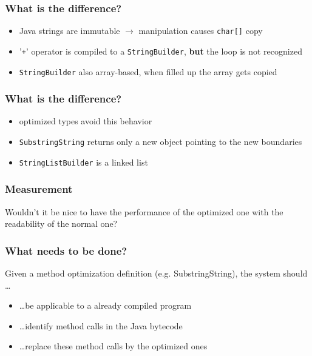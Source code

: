 \documentclass{beamer}
\begin{document}
\begin{frame}
  \frametitle{What is the difference?}
	\begin{itemize}
	  \item Java strings are immutable $\rightarrow$ manipulation causes \texttt{char[]} copy
	  \item '\texttt{+}' operator is compiled to a \texttt{StringBuilder}, {\bf but} the loop is not recognized
	  \item \texttt{StringBuilder} also array-based, when filled up the array gets copied 
	\end{itemize}
\end{frame}


\begin{frame}
  \frametitle{What is the difference?}
	\begin{itemize}
	  \item optimized types avoid this behavior 
	  \item \texttt{SubstringString} returns only a new object pointing to the new boundaries
	  \item \texttt{StringListBuilder} is a linked list
	\end{itemize} 
\end{frame}

\begin{frame}
  \frametitle{Measurement}

  \begin{bchart}[step=1000,max=3500]
      \smallskip
      \smallskip
  \end{bchart}
\end{frame}

\begin{frame}
  \begin{center}
  \huge Wouldn't it be nice to have the performance of the optimized one with the readability of the normal one?
  \end{center}

\end{frame}

\begin{frame}
  \frametitle{What needs to be done?}  
  Given a method optimization definition (e.g. SubstringString), the system should \dots
  
  \begin{itemize}
    \item \dots be applicable to a already compiled program
    \item \dots identify method calls in the Java bytecode
    \item \dots replace these method calls by the optimized ones
  \end{itemize}
\end{frame}
\end{document}
